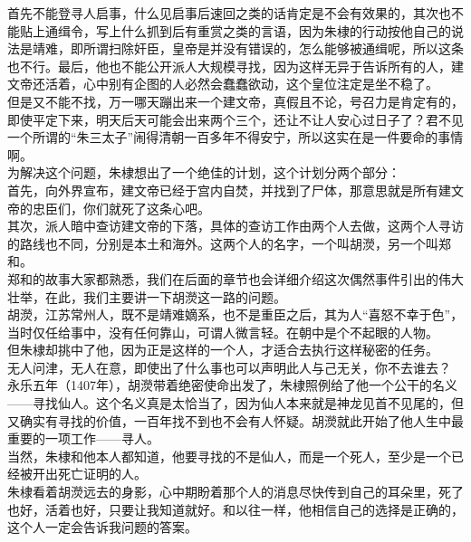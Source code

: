 \begin{multicols}{\theparacolNo}
首先不能登寻人启事，什么见启事后速回之类的话肯定是不会有效果的，其次也不能贴上通缉令，写上什么抓到后有重赏之类的言语，因为朱棣的行动按他自己的说法是靖难，即所谓扫除奸臣，皇帝是并没有错误的，怎么能够被通缉呢，所以这条也不行。最后，他也不能公开派人大规模寻找，因为这样无异于告诉所有的人，建文帝还活着，心中别有企图的人必然会蠢蠢欲动，这个皇位注定是坐不稳了。\\

但是又不能不找，万一哪天蹦出来一个建文帝，真假且不论，号召力是肯定有的，即使平定下来，明天后天可能会出来两个三个，还让不让人安心过日子了？君不见一个所谓的“朱三太子”闹得清朝一百多年不得安宁，所以这实在是一件要命的事情啊。\\

为解决这个问题，朱棣想出了一个绝佳的计划，这个计划分两个部分：\\

首先，向外界宣布，建文帝已经于宫内自焚，并找到了尸体，那意思就是所有建文帝的忠臣们，你们就死了这条心吧。\\

其次，派人暗中查访建文帝的下落，具体的查访工作由两个人去做，这两个人寻访的路线也不同，分别是本土和海外。这两个人的名字，一个叫胡濙，另一个叫郑和。\\

郑和的故事大家都熟悉，我们在后面的章节也会详细介绍这次偶然事件引出的伟大壮举，在此，我们主要讲一下胡濙这一路的问题。\\

胡濙，江苏常州人，既不是靖难嫡系，也不是重臣之后，其为人“喜怒不幸于色”，当时仅任给事中，没有任何靠山，可谓人微言轻。在朝中是个不起眼的人物。\\

但朱棣却挑中了他，因为正是这样的一个人，才适合去执行这样秘密的任务。\\

无人问津，无人在意，即使出了什么事也可以声明此人与己无关，你不去谁去？\\

永乐五年（1407年），胡濙带着绝密使命出发了，朱棣照例给了他一个公干的名义——寻找仙人。这个名义真是太恰当了，因为仙人本来就是神龙见首不见尾的，但又确实有寻找的价值，一百年找不到也不会有人怀疑。胡濙就此开始了他人生中最重要的一项工作——寻人。\\

当然，朱棣和他本人都知道，他要寻找的不是仙人，而是一个死人，至少是一个已经被开出死亡证明的人。\\

朱棣看着胡濙远去的身影，心中期盼着那个人的消息尽快传到自己的耳朵里，死了也好，活着也好，只要让我知道就好。和以往一样，他相信自己的选择是正确的，这个人一定会告诉我问题的答案。\\


\end{multicols}
